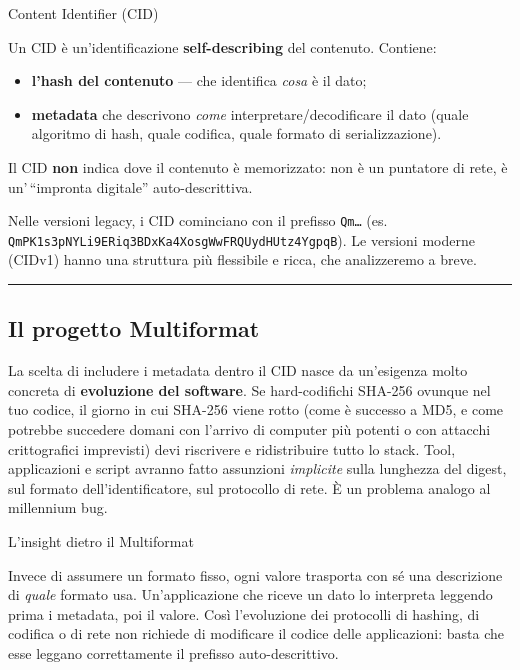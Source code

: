 \documentclass[
  italian,
  openany]{book}
\providecommand{\tightlist}{%
  \setlength{\itemsep}{0pt}\setlength{\parskip}{0pt}}
\begin{document}
\begin{calloutdefinition}{Content Identifier (CID)}

Un CID è un'identificazione \textbf{self-describing} del contenuto.
Contiene:

\begin{itemize}
\tightlist
\item
  \textbf{l'hash del contenuto} --- che identifica \emph{cosa} è il
  dato;
\item
  \textbf{metadata} che descrivono \emph{come} interpretare/decodificare
  il dato (quale algoritmo di hash, quale codifica, quale formato di
  serializzazione).
\end{itemize}

Il CID \textbf{non} indica dove il contenuto è memorizzato: non è un
puntatore di rete, è un'\,``impronta digitale'' auto-descrittiva.

\end{calloutdefinition}

Nelle versioni legacy, i CID cominciano con il prefisso \texttt{Qm…}
(es. \texttt{QmPK1s3pNYLi9ERiq3BDxKa4XosgWwFRQUydHUtz4YgpqB}). Le
versioni moderne (CIDv1) hanno una struttura più flessibile e ricca, che
analizzeremo a breve.

\begin{center}\rule{0.5\linewidth}{0.5pt}\end{center}

\subsection{Il progetto Multiformat}\label{il-progetto-multiformat}

La scelta di includere i metadata dentro il CID nasce da un'esigenza
molto concreta di \textbf{evoluzione del software}. Se hard-codifichi
SHA-256 ovunque nel tuo codice, il giorno in cui SHA-256 viene rotto
(come è successo a MD5, e come potrebbe succedere domani con l'arrivo di
computer più potenti o con attacchi crittografici imprevisti) devi
riscrivere e ridistribuire tutto lo stack. Tool, applicazioni e script
avranno fatto assunzioni \emph{implicite} sulla lunghezza del digest,
sul formato dell'identificatore, sul protocollo di rete. È un problema
analogo al millennium bug.

\begin{callouttip}{L’insight dietro il Multiformat}

Invece di assumere un formato fisso, ogni valore trasporta con sé una
descrizione di \emph{quale} formato usa. Un'applicazione che riceve un
dato lo interpreta leggendo prima i metadata, poi il valore. Così
l'evoluzione dei protocolli di hashing, di codifica o di rete non
richiede di modificare il codice delle applicazioni: basta che esse
leggano correttamente il prefisso auto-descrittivo.

\end{callouttip}
\end{document}
